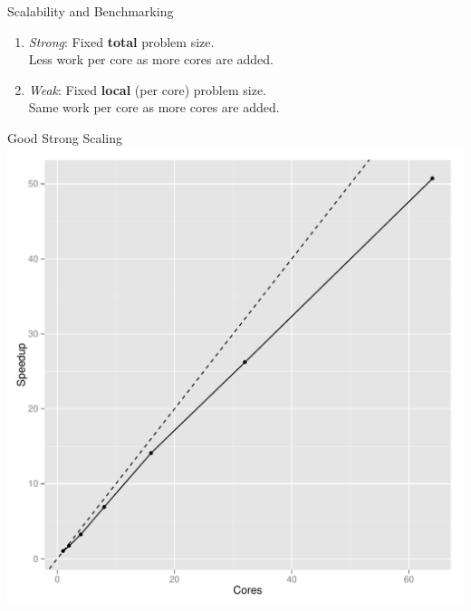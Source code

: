 \begin{frame}
  \begin{block}{Scalability and Benchmarking}
  \begin{enumerate}[<+-|alert@+>]
    \item \emph{Strong}:  Fixed \textbf{total} problem size.\\
    Less work per core as more cores are added.\\[.4cm]
    \item \emph{Weak}:  Fixed \textbf{local} (per core) problem size.\\
    Same work per core as more cores are added.
  \end{enumerate}  
  \end{block}
\end{frame}


\begin{frame}
   \begin{center}
    \begin{minipage}{.475\textwidth}
    \begin{block}{Good Strong Scaling}
      \centering
      \includegraphics[width=.95\textwidth]{../common/pics/scaling_strong}
    \end{block}
    \end{minipage}
    \hspace{.1cm}
    \begin{minipage}{.475\textwidth}

\end{minipage}
\end{center}
\end{frame}

